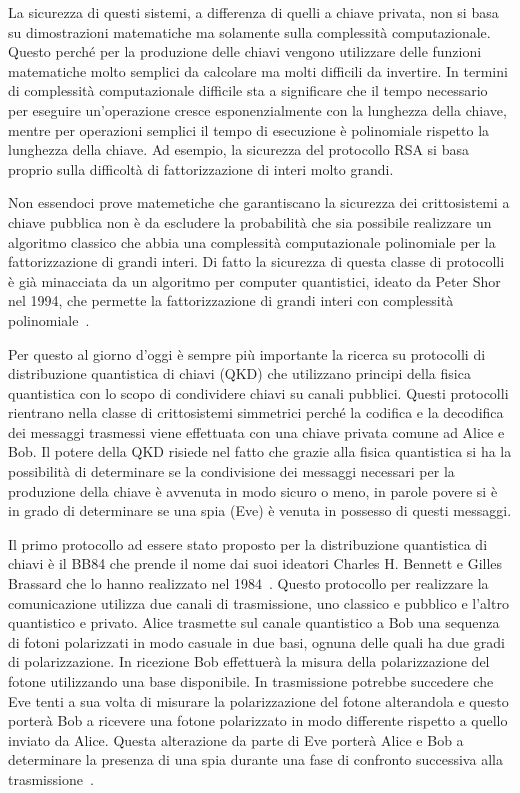 La sicurezza di questi sistemi, a differenza di quelli a chiave privata, non si basa su dimostrazioni matematiche ma solamente sulla complessit\`a computazionale. Questo perch\'e per la produzione delle chiavi vengono utilizzare delle funzioni matematiche molto semplici da calcolare ma molti difficili da invertire. In termini di complessit\`a computazionale difficile sta a significare che il tempo necessario per eseguire un'operazione cresce esponenzialmente con la lunghezza della chiave, mentre per operazioni semplici il tempo di esecuzione \`e polinomiale rispetto la lunghezza della chiave. Ad esempio, la sicurezza del protocollo RSA si basa proprio sulla difficolt\`a di fattorizzazione di interi molto grandi.

Non essendoci prove matemetiche che garantiscano la sicurezza dei crittosistemi a chiave pubblica non \`e da escludere la probabilit\`a che sia possibile realizzare un algoritmo classico che abbia una complessit\`a computazionale polinomiale per la fattorizzazione di grandi interi. Di fatto la sicurezza di questa classe di protocolli \`e gi\`a minacciata da un algoritmo per computer quantistici, ideato da Peter Shor nel 1994, che permette la fattorizzazione di grandi interi con complessit\`a polinomiale~\cite{365700}.

Per questo al giorno d'oggi \`e sempre pi\`u importante la ricerca su protocolli di distribuzione quantistica di chiavi (QKD) che utilizzano principi della fisica quantistica con lo scopo di condividere chiavi su canali pubblici. Questi protocolli rientrano nella classe di crittosistemi simmetrici perch\'e la codifica e la decodifica dei messaggi trasmessi viene effettuata con una chiave privata comune ad Alice e Bob. Il potere della QKD risiede nel fatto che grazie alla fisica quantistica si ha la possibilit\`a di determinare se la condivisione dei messaggi necessari per la produzione della chiave \`e avvenuta in modo sicuro o meno, in parole povere si \`e in grado di determinare se una spia (Eve) \`e venuta in possesso di questi messaggi.

Il primo protocollo ad essere stato proposto per la distribuzione quantistica di chiavi \`e il BB84 che prende il nome dai suoi ideatori Charles H. Bennett e Gilles Brassard che lo hanno realizzato nel 1984~\cite{ Bennett_2014}.
Questo protocollo per realizzare la comunicazione utilizza due canali di trasmissione, uno classico e pubblico e l'altro quantistico e privato. Alice trasmette sul canale quantistico a Bob una sequenza di fotoni polarizzati in modo casuale in due basi, ognuna delle quali ha due gradi di polarizzazione.
In ricezione Bob effettuer\`a la misura della polarizzazione del fotone utilizzando una base disponibile. In trasmissione potrebbe succedere che Eve tenti a sua volta di misurare la polarizzazione del fotone alterandola e questo porter\`a Bob a ricevere una fotone polarizzato in modo differente rispetto a quello inviato da Alice. Questa alterazione da parte di Eve porter\`a Alice e Bob a determinare la presenza di una spia durante una fase di confronto successiva alla trasmissione~\cite{zhao_development_2018}.


